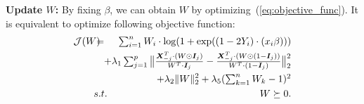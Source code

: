 \documentclass[sigconf]{acmart}
\newcommand*{\Scale}[2][4]{\scalebox{#1}{$#2$}}
\begin{document}
\par\noindent\textbf{Update $W$:} By fixing $\beta$, we can obtain $W$ by optimizing~(\ref{eq:objective_func}). It is equivalent to optimize following objective function:
\begin{eqnarray}
\label{eq:objective_func_W}
\mathcal{J}(W)\!\!\!\! &=& \!\!\!\! \Scale[1.0]{\sum_{i=1}^{n}W_i\cdot \log(1+\exp((1-2Y_i)\cdot (x_i\beta)))} \\
\nonumber&& \!\!\!\!\!\!\!\! + \Scale[1.0]{\lambda_1 \sum_{j=1}^{p} \big\|\frac{\bm{X}_{-j}^{T}\cdot(W\odot \bm{I}_j)}{W^{T}\cdot \bm{I}_j}-\frac{\bm{X}_{-j}^{T}\cdot(W\odot (1-\bm{I}_j))}{W^{T}\cdot (1-\bm{I}_j)}\big\|_2^2}\\
\nonumber&& \!\!\!\!\!\!\!\! + \lambda_2 \|W\|_2^2 + \Scale[1.0]{\lambda_5 (\sum_{k=1}^{n}W_k-1)^{2}} \\
\nonumber &s.t.& W\succeq 0.
\end{eqnarray}
\end{document}
